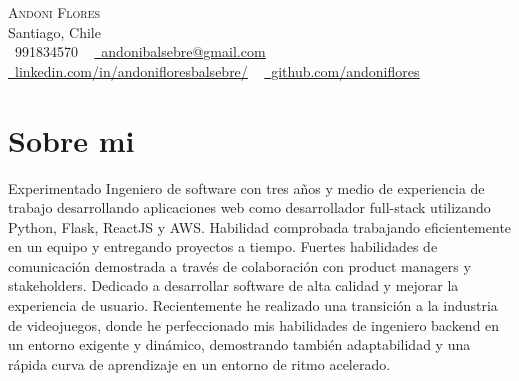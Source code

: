 \documentclass[letterpaper,11pt]{article}
\newcommand{\resumeSubHeadingListStart}{\begin{itemize}[leftmargin=0.0in, label={}]}
\newcommand{\resumeSubHeadingListEnd}{\end{itemize}}
\begin{document}

\begin{center}
    {\Huge \scshape Andoni Flores} \\ \vspace{1pt}
    Santiago, Chile  \\ \vspace{1pt}
    \small \raisebox{-0.1\height}\faPhone\ 991834570 ~ \href{mailto:andonibalsebre@gmail.com}{\raisebox{-0.2\height}\faEnvelope\  \underline{andonibalsebre@gmail.com}} ~ 
    \href{https://linkedin.com/in/andonifloresbalsebre/}{\raisebox{-0.2\height}\faLinkedin\ \underline{linkedin.com/in/andonifloresbalsebre/}}  ~
    \href{https://github.com/andoniflores}{\raisebox{-0.2\height}\faGithub\ \underline{github.com/andoniflores}}
    \vspace{-8pt}
\end{center}
%

\section{Sobre mi}
  \resumeSubHeadingListStart
    \small{\item{Experimentado Ingeniero de software con tres años y medio de experiencia de trabajo
        desarrollando aplicaciones web como desarrollador full-stack utilizando Python, Flask,
        ReactJS y AWS. Habilidad comprobada trabajando eficientemente en un equipo y entregando
        proyectos a tiempo. Fuertes habilidades de comunicación demostrada a través de colaboración
        con product managers y stakeholders. Dedicado a desarrollar software de alta calidad y
        mejorar la experiencia de usuario. Recientemente he realizado una transición a la industria 
        de videojuegos, donde he perfeccionado mis habilidades de ingeniero backend en un entorno exigente
        y dinámico, demostrando también adaptabilidad y una rápida curva de aprendizaje en un entorno de ritmo
        acelerado.}}
  \resumeSubHeadingListEnd
\end{document}
